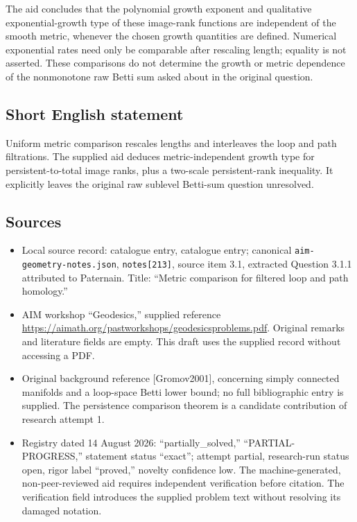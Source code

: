 \documentclass[11pt]{article}
\begin{document}
The aid concludes that the polynomial growth exponent and qualitative exponential-growth type of these image-rank functions are independent of the smooth metric, whenever the chosen growth quantities are defined. Numerical exponential rates need only be comparable after rescaling length; equality is not asserted. These comparisons do not determine the growth or metric dependence of the nonmonotone raw Betti sum asked about in the original question.
\subsection{Short English statement}
Uniform metric comparison rescales lengths and interleaves the loop and path filtrations. The supplied aid deduces metric-independent growth type for persistent-to-total image ranks, plus a two-scale persistent-rank inequality. It explicitly leaves the original raw sublevel Betti-sum question unresolved.
\subsection{Sources}
\begin{itemize}
\item Local source record: catalogue entry, catalogue entry; canonical \texttt{aim-geometry-notes.json}, \texttt{notes[213]}, source item 3.1, extracted Question 3.1.1 attributed to Paternain. Title: ``Metric comparison for filtered loop and path homology.''
\item AIM workshop ``Geodesics,'' supplied reference \url{https://aimath.org/pastworkshops/geodesicsproblems.pdf}. Original remarks and literature fields are empty. This draft uses the supplied record without accessing a PDF.
\item Original background reference [Gromov2001], concerning simply connected manifolds and a loop-space Betti lower bound; no full bibliographic entry is supplied. The persistence comparison theorem is a candidate contribution of research attempt 1.
\item Registry dated 14 August 2026: ``partially\_solved,'' ``PARTIAL-PROGRESS,'' statement status ``exact''; attempt partial, research-run status open, rigor label ``proved,'' novelty confidence low. The machine-generated, non-peer-reviewed aid requires independent verification before citation. The verification field introduces the supplied problem text without resolving its damaged notation.
\end{itemize}
\end{document}
